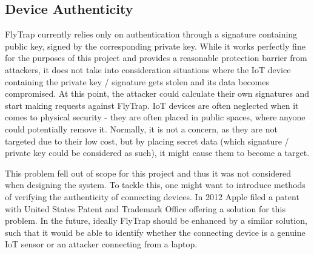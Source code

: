 \subsection{Device Authenticity}
FlyTrap currently relies only on authentication through a signature containing public key, signed by the corresponding private key. While it works perfectly fine for the purposes of this project and provides a reasonable protection barrier from attackers, it does not take into consideration situations where the IoT device containing the private key / signature gets stolen and its data becomes compromised. At this point, the attacker could calculate their own signatures and start making requests against FlyTrap. IoT devices are often neglected when it comes to physical security - they are often placed in public spaces, where anyone could potentially remove it. Normally, it is not a concern, as they are not targeted due to their low cost, but by placing secret data (which signature / private key could be considered as such), it might cause them to become a target.

This problem fell out of scope for this project and thus it was not considered when designing the system. To tackle this, one might want to introduce methods of verifying the authenticity of connecting devices. In 2012 Apple filed a patent with United States Patent and Trademark Office \cite{omernick2012systems} offering a solution for this problem. In the future, ideally FlyTrap should be enhanced by a similar solution, such that it would be able to identify whether the connecting device is a genuine IoT sensor or an attacker connecting from a laptop.